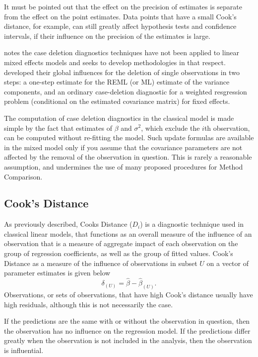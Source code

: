 \documentclass[12pt, a4paper]{report}
\theoremstyle{plain}
\theoremstyle{definition}
\theoremstyle{remark}
\begin{document}
	
	
	It must be pointed out that the effect on the precision of estimates is separate from the effect on the point estimates. Data points that have a small Cook's distance, for example, can still greatly affect hypothesis tests and confidence intervals, if their 
	influence on the precision of the estimates is large.	
	
	\citet{Christensen} notes the case deletion diagnostics techniques have not been applied to linear mixed effects models and seeks to develop methodologies in that respect. \citet{Christensen} developed their global influences for the deletion of single observations in two steps: a one-step estimate for the REML (or ML) estimate of the variance components, and an ordinary case-deletion diagnostic for a weighted resgression problem (conditional on the estimated covariance matrix) for fixed effects.
	
	The computation of case deletion diagnostics in the classical model is made simple by the fact that estimates of $\beta$ and $\sigma^2$, which exclude the $i$th observation, can be computed without re-fitting the model. Such update formulas are available in the mixed model only if you assume that the covariance parameters are not affected by the removal of the observation in question. This is rarely a reasonable assumption, and undermines the use of many proposed procedures for Method Comparison.
	
	\subsection{Cook's Distance}
	As previously described,  Cooks Distance ($D_{i}$) is a diagnostic technique used in classical linear models, that functions as an overall measure of the influence of an observation that is a measure of aggregate impact of each observation on the group of regression coefficients, as well as the group of fitted values.  Cook's Distance as a measure of the influence of observations in subset $U$ on a vector of parameter estimates is given below \citep{cook77}
	\[ \delta_{(U)} = \hat{\beta} - \hat{\beta}_{(U)}.\]
	Observations, or sets of observations, that have high Cook's distance usually have high residuals, although this is not necessarily the case.
	
	
	If the predictions are the same with or without the observation in question, then the observation has no influence on the regression model. If the predictions differ greatly when the observation is not included in the analysis, then the observation is influential.
	
\end{document}
